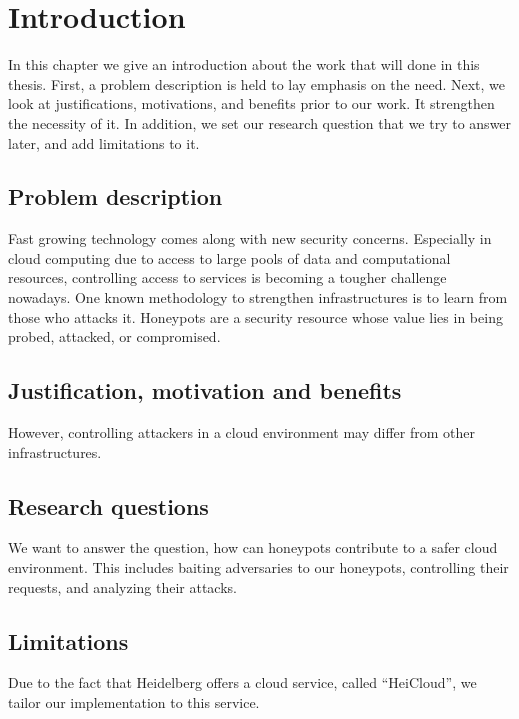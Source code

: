\chapter{Introduction}

In this chapter we give an introduction about the work that will done in this thesis. First, a problem description is held to lay emphasis on the need. Next, we look at justifications, motivations, and benefits prior to our work. It strengthen the necessity of it. In addition, we set our research question that we try to answer later, and add limitations to it.

\section{Problem description}


Fast growing technology comes along with new security concerns. Especially in cloud computing due to access to large pools of data and computational resources, controlling access to services is becoming a tougher challenge nowadays. One known methodology to strengthen infrastructures is to learn from those who attacks it. Honeypots are a security resource whose value lies in being probed, attacked, or compromised.

\section{Justification, motivation and benefits}

However, controlling attackers in a cloud environment may differ from
other infrastructures.

\section{Research questions}

We want to answer the question, how can honeypots contribute to a safer cloud environment. This includes baiting adversaries to our honeypots, controlling their requests, and analyzing their attacks.

\section{Limitations}

Due to the fact that Heidelberg offers a cloud service, called
\enquote{HeiCloud}, we tailor our implementation to this service.
